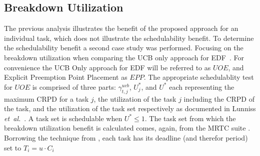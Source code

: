 \subsection{Breakdown Utilization}
The previous analysis illustrates the benefit of the proposed
approach for an individual task, which does not illustrate the
schedulability benefit. To determine the schedulability benefit a
second case study was performed. Focusing on the breakdown utilization
when comparing the UCB only approach for EDF~\cite{lunniss:13}. For
convenience the UCB Only approach for EDF will be referred to as
${UOE}$, and Explicit Preemption Point Placement as ${EPP}$.
%
The appropriate schedulablity test for ${UOE}$ is comprised of three parts: 
${\gamma^{ucb}_{t,j}}$, ${U^*_j}$, and ${U^*}$ each representing
the maximum CRPD for a task ${j}$, the utilization of the task ${j}$
including the CRPD of the task, and the utilization of the task set 
respectively as documented in Lunniss \emph{et~al.}~\cite{lunniss:13}.  
A task set is schedulable when ${U^* \le 1}$.
%
\newline
\indent
The task set from which the breakdown utilization benefit is
calculated comes, again, from the MRTC suite \cite{mrtc:01}. Borrowing
the technique from \cite{lunniss:13}, each task has its deadline (and
therefor period) set to ${T_i = u \cdot C_i}$
